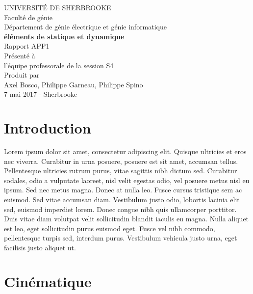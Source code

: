 \documentclass{article}
\begin{document}
\begin{titlepage}   
	\large{
		\begin{center}
			UNIVERSITÉ DE SHERBROOKE\\Faculté de génie\\
			Département de génie électrique et génie informatique\\
			\vspace{3cm}
			{\LARGE\textbf{éléments de statique et dynamique}}\\
			\vspace{2cm}
			\LARGE{Rapport APP1}\\
			\vspace{2cm}
			Présenté à\\l'équipe professorale de la session S4\\
			\vspace{2cm}
			Produit par\\Axel Bosco, Philippe Garneau, Philippe Spino\\
			\vspace{1cm}
			\vfill{7 mai 2017 - Sherbrooke}
		\end{center}
	}
\end{titlepage}
\newpage
\tableofcontents

\newpage
\section{Introduction}
Lorem ipsum dolor sit amet, consectetur adipiscing elit. Quisque ultricies et eros nec viverra. Curabitur in urna posuere, posuere est sit amet, accumsan tellus. Pellentesque ultricies rutrum purus, vitae sagittis nibh dictum sed. Curabitur sodales, odio a vulputate laoreet, nisl velit egestas odio, vel posuere metus nisl eu ipsum. Sed nec metus magna. Donec at nulla leo. Fusce cursus tristique sem ac euismod. Sed vitae accumsan diam. Vestibulum justo odio, lobortis lacinia elit sed, euismod imperdiet lorem. Donec congue nibh quis ullamcorper porttitor. Duis vitae diam volutpat velit sollicitudin blandit iaculis eu magna. Nulla aliquet est leo, eget sollicitudin purus euismod eget. Fusce vel nibh commodo, pellentesque turpis sed, interdum purus. Vestibulum vehicula justo urna, eget facilisis justo aliquet ut. 

\section{Cinématique}
\end{document}
